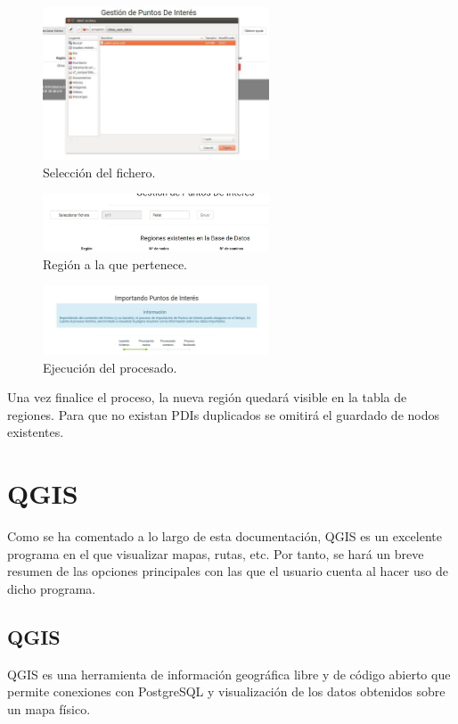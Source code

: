 \begin{figure}[h]
  \centering
    \includegraphics[width=0.6\textwidth]{../img/osmextract/subida1.jpg}
  \caption{Selección del fichero.}
  \label{subida1}
\end{figure}
\begin{figure}[h]
  \centering
    \includegraphics[width=0.6\textwidth]{../img/osmextract/subida2.jpg}
  \caption{Región a la que pertenece.}
  \label{subida2}
\end{figure}
\begin{figure}[h]
  \centering
    \includegraphics[width=0.6\textwidth]{../img/osmextract/subida3.jpg}
  \caption{Ejecución del procesado.}
  \label{subida3}
\end{figure}
Una vez finalice el proceso, la nueva región quedará visible en la tabla de regiones. Para que no existan PDIs duplicados se omitirá el guardado de nodos existentes.



\section{QGIS}
Como se ha comentado a lo largo de esta documentación, QGIS es un excelente programa en el que visualizar mapas, rutas, etc. Por tanto, se hará un breve resumen de las opciones principales con las que el usuario cuenta al hacer uso de dicho programa.

\subsection{QGIS}
QGIS es una herramienta de información geográfica libre y de código abierto que permite conexiones con PostgreSQL y visualización de los datos obtenidos sobre un mapa físico. 

